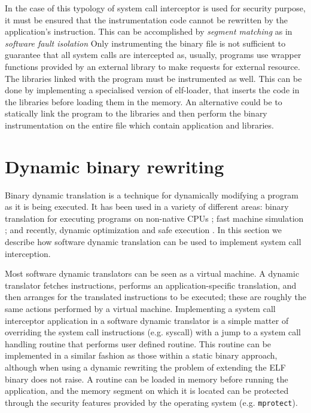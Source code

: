In the case of this typology of system call interceptor is used for security purpose,  it must be ensured that the instrumentation code cannot be rewritten by the application's instruction. This can be accomplished by  \emph{segment matching} as in \emph{software fault isolation} Only instrumenting the binary file is not sufficient to guarantee that all system calls are intercepted as, usually, programs use  wrapper functions provided by an external library to make requests for external resource. The libraries linked with the program must be instrumented as well. This can be done by implementing a specialised version of elf-loader, that inserts the code in the libraries before loading them in the memory. An alternative could be to statically link the program to the libraries and then perform the binary instrumentation on the entire file which contain application and libraries.        




\section{Dynamic binary rewriting}
\label{dynamic_rewriting}

Binary dynamic translation is a technique for dynamically modifying a program as it is being executed. It has been used in a variety of different areas: binary translation for executing programs on non-native CPUs  \cite{Ebcioglu97daisy:dynamic}; fast machine simulation \cite{Witchel96embra:fast}; and recently, dynamic optimization and safe execution \cite{DynamoRio, Strata, vx32}. In this section we describe how software dynamic translation can be used to implement system call interception.

Most software dynamic translators can be seen as a virtual machine. A dynamic translator fetches instructions, performs an application-specific translation, and then arranges for the translated instructions to be executed; these are roughly the same actions performed by a virtual machine. Implementing a system call interceptor application in a software dynamic translator is a simple matter of overriding the system call instructions (e.g. syscall) with a jump to a system call handling routine that performs user defined routine. This routine can be implemented in a similar fashion as those within a static binary approach, although when using a dynamic rewriting the problem of extending the ELF binary does not raise. A routine can be loaded in memory before running the application, and the memory segment on which it is located can be protected through the security features provided by the operating system (e.g. \lstinline$mprotect$). 

